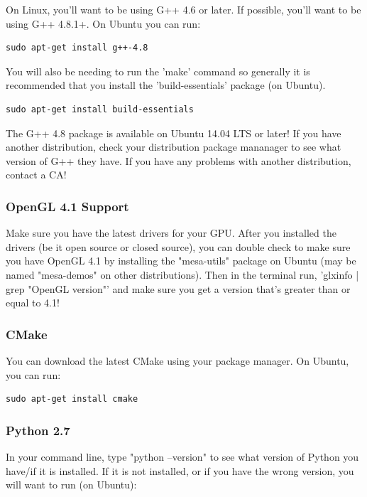 \documentclass{article}
\begin{document}
On Linux, you'll want to be using G++ 4.6 or later. If possible, you'll want to be using G++ 4.8.1+. On Ubuntu you can run:

\begin{lstlisting}
sudo apt-get install g++-4.8
\end{lstlisting}

You will also be needing to run the 'make' command so generally it is recommended that you install the 'build-essentials' package (on Ubuntu).

\begin{lstlisting}
sudo apt-get install build-essentials
\end{lstlisting}

The G++ 4.8 package is available on Ubuntu 14.04 LTS or later! If you have another distribution, check your distribution package mananager to see what version of G++ they have. If you have any problems with another distribution, contact a CA!

\subsubsection*{OpenGL 4.1 Support}

Make sure you have the latest drivers for your GPU. After you installed the drivers (be it open source or closed source), you can double check to make sure you have OpenGL 4.1 by installing the "mesa-utils" package on Ubuntu (may be named "mesa-demos" on other distributions). Then in the terminal run, 'glxinfo | grep "OpenGL version"' and make sure you get a version that's greater than or equal to 4.1!

\subsubsection*{CMake}

You can download the latest CMake using your package manager. On Ubuntu, you can run:

\begin{lstlisting}
sudo apt-get install cmake
\end{lstlisting}

\subsubsection*{Python 2.7}

In your command line, type "python --version" to see what version of Python you have/if it is installed. If it is not installed, or if you have the wrong version, you will want to run (on Ubuntu): 
\end{document}
